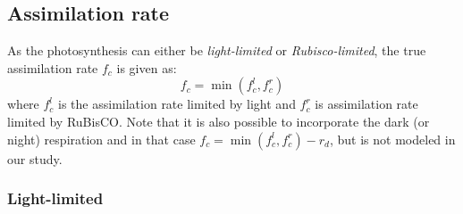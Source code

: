 
\subsection{Assimilation rate}
\label{subsubsec:ar}

As the photosynthesis can either be \textit{light-limited} or \textit{Rubisco-limited}, the true assimilation rate $f_c$ is given as:
\begin{equation}
f_c = \min \left(f_{c}^l, f_c^r\right) 
\end{equation}
where $f_c^l$ is the assimilation rate limited by light and $f_c^r$ is assimilation rate limited by RuBisCO. Note that it is also possible to incorporate the dark (or night) respiration and in that case $f_c = \min \left(f_c^l, f_c^r\right) - r_d$, but is not modeled in our study.
	
\subsubsection*{Light-limited}

